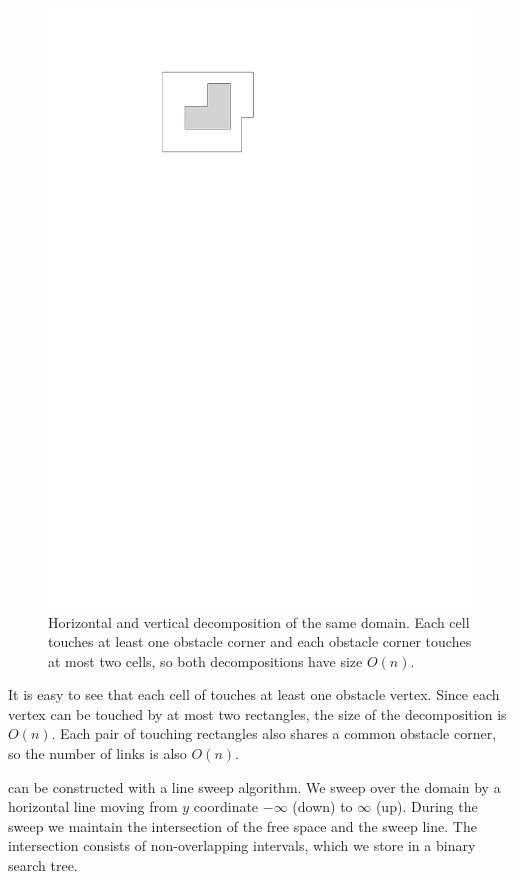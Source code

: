 \documentclass[english,gradu]{tktltiki2018}
\begin{document}
\begin{figure}
	\includegraphics[scale=0.6,page=3]{fig/decomp}
	\caption{Horizontal and vertical decomposition of the same domain. Each cell touches at least one obstacle corner and each obstacle corner touches at most two cells, so both decompositions have size $O(n)$.}\label{fig:decomp}
\end{figure}

It is easy to see that each cell of  touches at least one obstacle vertex.
Since each vertex can be touched by at most two rectangles, the size of the decomposition is $O(n)$.
Each pair of touching rectangles also shares a common obstacle corner, so the number of links is also $O(n)$.

 can be constructed with a line sweep algorithm.
We sweep over the domain by a horizontal line moving from $y$ coordinate $-\infty$ (down) to $\infty$ (up).
During the sweep we maintain the intersection of the free space \fspace and the sweep line.
The intersection consists of non-overlapping intervals, which we store in a binary search tree.
\end{document}
